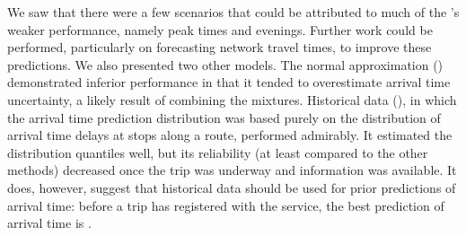 We saw that there were a few scenarios that could be attributed to much of the \pf{}'s weaker performance, namely peak times and evenings. Further work could be performed, particularly on forecasting network travel times, to improve these predictions. We also presented two other models. The normal approximation (\Fnorm{}) demonstrated inferior performance in that it tended to overestimate arrival time uncertainty, a likely result of combining the mixtures. Historical data (\Fhist{}), in which the arrival time prediction distribution was based purely on the distribution of arrival time delays at stops along a route, performed admirably. It estimated the distribution quantiles well, but its reliability (at least compared to the other methods) decreased once the trip was underway and \rt{} information was available. It does, however, suggest that historical data should be used for prior predictions of arrival time: before a trip has registered with the \rt{} service, the best prediction of arrival time is \Fhist{}.
